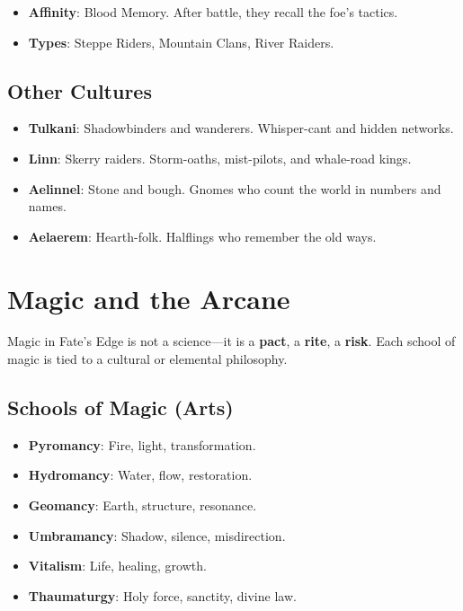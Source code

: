 \begin{itemize}
    \item \textbf{Affinity}: Blood Memory. After battle, they recall the foe's tactics.
    \item \textbf{Types}: Steppe Riders, Mountain Clans, River Raiders.
\end{itemize}

\subsection*{Other Cultures}

\begin{itemize}
    \item \textbf{Tulkani}: Shadowbinders and wanderers. Whisper-cant and hidden networks.
    \item \textbf{Linn}: Skerry raiders. Storm-oaths, mist-pilots, and whale-road kings.
    \item \textbf{Aelinnel}: Stone and bough. Gnomes who count the world in numbers and names.
    \item \textbf{Aelaerem}: Hearth-folk. Halflings who remember the old ways.
\end{itemize}

\section*{Magic and the Arcane}

Magic in Fate's Edge is not a science---it is a \textbf{pact}, a \textbf{rite}, a \textbf{risk}. Each school of magic is tied to a cultural or elemental philosophy.

\subsection*{Schools of Magic (Arts)}

\begin{itemize}
    \item \textbf{Pyromancy}: Fire, light, transformation.
    \item \textbf{Hydromancy}: Water, flow, restoration.
    \item \textbf{Geomancy}: Earth, structure, resonance.
    \item \textbf{Umbramancy}: Shadow, silence, misdirection.
    \item \textbf{Vitalism}: Life, healing, growth.
    \item \textbf{Thaumaturgy}: Holy force, sanctity, divine law.
\end{itemize}

